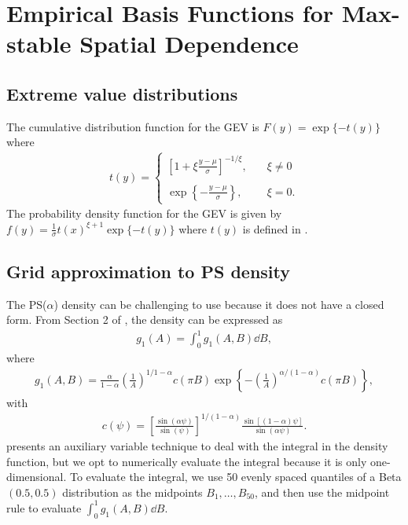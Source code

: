 \chapter{Empirical Basis Functions for Max-stable Spatial Dependence}
\label{appendix:c}

\section{Extreme value distributions} \label{eba:GEV}
The cumulative distribution function for the GEV is $F(y) = \exp\{-t(y)\}$ where
\begin{align} \label{ebeq:gevt}
  t(y) = \begin{cases}
      \left[1 + \xi \displaystyle \frac{y - \mu}{\sigma}\right]^{-1 / \xi}, \quad &\xi \neq 0 \\
      \\
      \exp\left\{- \displaystyle \frac{y - \mu}{\sigma}\right\}, &\xi = 0.
  \end{cases}
\end{align}
The probability density function for the GEV is given by $f(y) = \displaystyle \frac{1}{\sigma} t(x)^{\xi + 1} \exp\{-t(y)\}$ where $t(y)$ is defined in .

\section{Grid approximation to PS density} \label{eba:gridapprox}
The PS($\alpha$) density can be challenging to use because it does not have a closed form.
From Section 2 of \citep{Stephenson2009}, the density can be expressed as
\begin{align}
  g_1(A) = \int_0^1 g_1(A, B) \dd B,
\end{align}
where
\begin{align}
  g_1(A, B) = \frac{\alpha}{1 - \alpha} \left( \frac{1}{A} \right)^{1 / 1 - \alpha} c(\pi B) \exp \left\{ -\left(\frac{1}{A}\right)^{\alpha / (1 - \alpha)} c(\pi B) \right\},
\end{align}
with
\begin{align}
  c(\psi) = \left[\frac{\sin(\alpha \psi)}{\sin(\psi)}\right]^{1 / (1 - \alpha)} \frac{\sin[(1 - \alpha) \psi]}{\sin(\alpha \psi)}.
\end{align}
 presents an auxiliary variable technique to deal with the integral in the density function, but we opt to numerically evaluate the integral because it is only one-dimensional.
To evaluate the integral, we use 50 evenly spaced quantiles of a Beta$(0.5, 0.5)$ distribution as the midpoints $B_1, \ldots, B_{50}$, and then use the midpoint rule to evaluate $\displaystyle \int_0^1 g_1(A, B) \dd B$.

